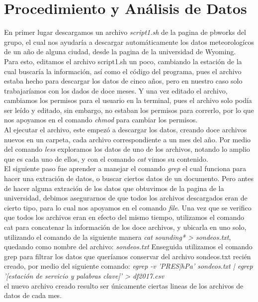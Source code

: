 \documentclass{article}
\begin{document}
\section{Procedimiento y Análisis de Datos}
En primer lugar descargamos un archivo \textit{script1.sh} de la pagina de pbworks del grupo, el cual nos ayudaría a descargar automáticamente los datos meteorologícos de un año de alguna ciudad, desde la pagina de la universidad de Wyoming.\\ Para esto, editamos el archivo script1.sh un poco, cambiando la estación de la cual buscaría la información, así como el código del programa, pues el archivo estaba hecho para descargar los datos de cinco años, pero en nuestro caso solo trabajaríamos con los dados de doce meses. Y una vez editado el archivo, cambiamos los permisos para el usuario en la terminal, pues el archivo solo podía ser leído y editado, sin embargo, no estaban los permisos para correrlo, por lo que nos apoyamos en el comando \textit{chmod} para cambiar los permisos.\\ Al ejecutar el archivo, este empezó a descargar los datos, creando doce archivos nuevos en un carpeta, cada archivo correspondiente a un mes del año.
Por medio del comando \textit{less} exploramos los datos de uno de los archivos, notando lo amplio que es cada uno de ellos, y con el comando \textit{cat} vimos su contenido. \\ El siguiente paso fue aprender a manejar el comando \textit{grep} el cual funciona para hacer una extración de datos, o buscar ciertos datos de un documento.
Pero antes de hacer alguna extración de los datos que obtuvimos de la pagina de la universidad, debimos asegurarnos de que todos los archivos descargados eran de cierto tipo, para lo cual nos apoyamos en el comando \textit{file}. Una vez que se verifico que todos los archivos eran en efecto del mismo tiempo, utilizamos el comando cat para concatenar la información de los doce archivos, y ubicarla en uno solo, utilizando el comando de la siguiente manera \textit{cat sounding* > sondeos.txt}, quedando como nombre del archivo: \textit{sondeos.txt}
Enseguida utilizamos el comando grep para filtrar los datos que queríamos conservar del archivo sondeos.txt recién creado, por medio del siguiente comando: \textit{egrep -v 'PRES|hPa' sondeos.txt | egrep '[estación de servicio y palabras clave]' > df2017.csv} \\ el nuevo archivo creado resulto ser únicamente ciertas lineas de los archivos de datos de cada mes.
\end{document}
